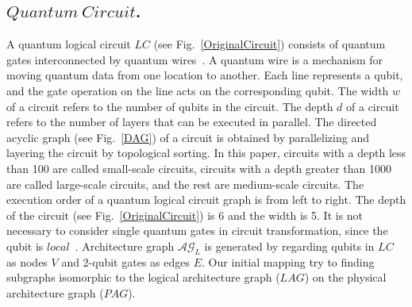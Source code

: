 \documentclass[runningheads]{llncs}
\begin{document}
 \subsection{$Quantum \ Circuit$.}
A quantum logical circuit $LC$ (see Fig.~\ref{OriginalCircuit}) consists of quantum gates interconnected by quantum wires~\cite{Daei2020}.
A quantum wire is a mechanism for moving quantum data from one location to another.
Each line represents a qubit, and the gate operation on the line acts on the corresponding qubit.
 The width $w$ of a circuit refers to the number of qubits in the circuit.
 The depth $d$ of a circuit refers to the number of layers that can be executed in parallel.
The directed acyclic graph (see Fig.~\ref{DAG}) of a circuit is obtained by parallelizing 
and layering the circuit by topological sorting.
In this paper, circuits with a depth less than 100 are called small-scale circuits, 
circuits with a depth greater than 1000 are called large-scale circuits, 
and the rest are medium-scale circuits.
The execution order of a quantum logical circuit graph is from left to right. 
The depth of the circuit (see Fig.~\ref{OriginalCircuit}) is 6 and the width is 5. 
It is not necessary to consider single quantum gates in circuit transformation, 
since the qubit is $local$~\cite{2013Optimization}. 
Architecture graph $\mathcal{AG}_{L}$  is generated by regarding qubits in $LC$
as nodes $V$  and 2-qubit gates as edges $E$. 
Our initial mapping try to finding subgraphs isomorphic to the logical architecture graph ($LAG$)
on the physical architecture graph ($PAG$).
\end{document}
